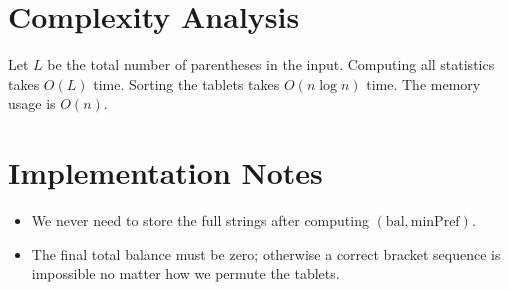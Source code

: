 \documentclass[11pt]{article}
\begin{document}
\section*{Complexity Analysis}

Let $L$ be the total number of parentheses in the input. Computing all statistics takes $O(L)$ time.
Sorting the tablets takes $O(n \log n)$ time. The memory usage is $O(n)$.

\section*{Implementation Notes}

\begin{itemize}[leftmargin=*]
    \item We never need to store the full strings after computing $(\text{bal}, \text{minPref})$.
    \item The final total balance must be zero; otherwise a correct bracket sequence is impossible no matter
    how we permute the tablets.
\end{itemize}
\end{document}
